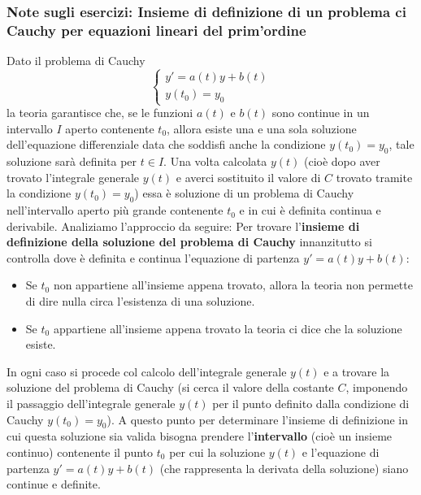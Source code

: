 \subsubsection{Note sugli esercizi: Insieme di definizione di un problema ci Cauchy per equazioni lineari del prim'ordine}
Dato il problema di Cauchy
\[
    \begin{cases}
        y'= a(t) y + b(t)\\ y(t_0) = y_0
    \end{cases}
\]
la teoria garantisce che, se le funzioni $a(t)$ e $b(t)$ sono continue in un intervallo $I$ aperto contenente $t_0$, allora esiste una e una sola soluzione dell'equazione differenziale data che soddisfi anche la condizione $y(t_0) = y_0$, tale soluzione sarà definita per $t \in I$.\newline
Una volta calcolata $y(t)$ (cioè dopo aver trovato l'integrale generale $y(t)$ e averci sostituito il valore di $C$ trovato tramite la condizione $y(t_0) = y_0$) essa è soluzione di un problema di Cauchy nell'intervallo aperto più grande contenente $t_0$ e in cui è definita continua e derivabile.
\newline
\newline
Analiziamo l'approccio da seguire:\newline
\newline
Per trovare l'\textbf{insieme di definizione della soluzione del problema di Cauchy} innanzitutto si controlla dove è definita e continua l'equazione di partenza $y' = a(t) y + b(t)$:
\begin{itemize}
    \item Se $t_0$ non appartiene all'insieme appena trovato, allora la teoria non permette di dire nulla circa l'esistenza di una soluzione.
    \item Se $t_0$ appartiene all'insieme appena trovato la teoria ci dice che la soluzione esiste.
\end{itemize}
In ogni caso si procede col calcolo dell'integrale generale $y(t)$ e a trovare la soluzione del problema di Cauchy (si cerca il valore della costante $C$, imponendo il passaggio dell'integrale generale $y(t)$ per il punto definito dalla condizione di Cauchy $y(t_0) = y_0$).
\newline
\newline
A questo punto per determinare l'insieme di definizione in cui questa soluzione sia valida bisogna prendere l'\textbf{intervallo} (cioè un insieme continuo) contenente il punto $t_0$ per cui la soluzione $y(t)$ e l'equazione di partenza $y'= a(t)y + b(t)$ (che rappresenta la derivata della soluzione) siano continue e definite.
